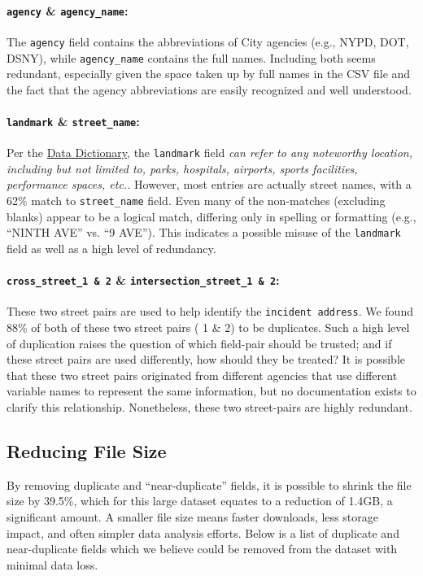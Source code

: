 \documentclass[linenumber]{jdsart}
\begin{document}
\paragraph{\texttt{agency} \& \texttt{agency\_name}:} The \texttt{agency} 
field contains the abbreviations of City agencies (e.g., NYPD, DOT, DSNY), 
while \texttt{agency\_name} contains the full names. Including both seems 
redundant, especially given the space taken up by full names in the 
CSV file and the fact that the agency abbreviations are 
easily recognized and well understood.

\paragraph{\texttt{landmark} \& \texttt{street\_name}:} Per the \href{https://data.cityofnewyork.us/api/views/erm2-nwe9/files/b372b884-f86a-453b-ba16-1fe06ce9d212?download=true&filename=311_ServiceRequest_2010-Present_DataDictionary_Updated_2023.xlsx}{Data Dictionary}, 
the \texttt{landmark} field \textit{can refer to any noteworthy location, 
including but not limited to, parks, hospitals, airports, sports facilities, 
performance spaces, etc..} However, most entries are actually 
street names, with a 62\% match to \texttt{street\_name} field. 
Even many of the non\mbox{-}matches (excluding blanks) appear to be 
a logical match, differing only in spelling or formatting 
(e.g., ``NINTH AVE'' vs. ``9 AVE''). This indicates a possible 
misuse of the \texttt{landmark} field as well as a high level of redundancy.

\paragraph{\texttt{cross\_street\_1 \& 2} \& \texttt{intersection\_street\_1 \& 2}:} These 
two street pairs are used to help identify the 
\texttt{incident address}. We found 88\% of both of these two 
street pairs ( 1 \& 2) to be duplicates. Such a high level of duplication 
raises the question of which field\mbox{-}pair should be trusted; 
and if these street pairs are used differently, how should they be treated?
It is possible that these two street pairs originated from different 
agencies that use different variable names to represent the same 
information, but no documentation exists to clarify this 
relationship. Nonetheless, these two street\mbox{-}pairs are highly redundant.


\subsection{Reducing File Size}
\label{sec:filesize}
By removing duplicate and ``near\mbox{-}duplicate'' fields, it is possible to 
shrink the file size by 39.5\%, which for this large dataset equates to 
a reduction of 1.4GB, a significant amount. A smaller file size 
means faster downloads, less storage impact, and often 
simpler data analysis efforts. Below is a list of duplicate 
and near\mbox{-}duplicate fields which we believe could be
removed from the dataset with minimal data loss. 
\end{document}
